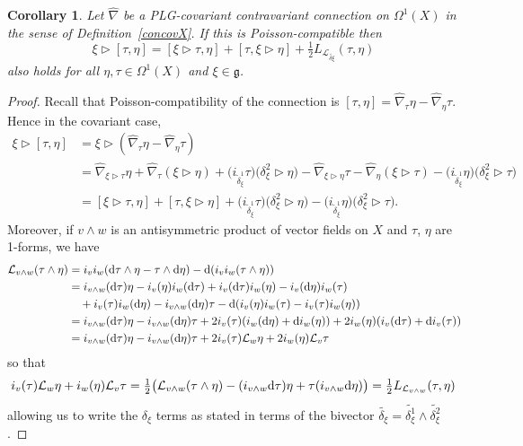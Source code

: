 \documentclass[10pt,a4paper]{amsart}
\numberwithin{equation}{section}
\newtheorem{Corollary}[Theorem]{Corollary}
\newcommand{\<}{{\langle}}
\renewcommand{\>}{{\rangle}}
\newcommand{\CL}{{\mathcal{L}}}
\newcommand{\extd}{{\rm d}}
\newcommand{\la}{{\triangleright}}
\newcommand{\cg}{{\mathfrak{g}}}
\begin{document}
\begin{Corollary}\label{corconcovX} Let $\hat\nabla$ be a PLG-covariant contravariant connection on $\Omega^1(X)$ in the sense of Definition~{\rm \ref{concovX}}. If this is Poisson-compatible then
\begin{equation*}%
\xi\la[\tau,\eta]=[\xi\la\tau,\eta]+[\tau,\xi\la\eta]+\tfrac{1}{2} L_{\CL_{\tilde{\delta\xi}}}(\tau,\eta)\end{equation*}
also holds for all $\eta,\tau\in \Omega^1(X)$ and $\xi\in \cg$.
\end{Corollary}
\begin{proof}
Recall that Poisson-compatibility of the connection is $[\tau,\eta]=\hat\nabla_\tau\eta-\hat\nabla_\eta\tau$. Hence in the covariant case,
\begin{align*}
\xi\la[\tau,\eta]& =\xi\la(\hat\nabla_\tau\eta-\hat\nabla_\eta\tau)\\
&=\hat\nabla_{\xi\la\tau}\eta+\hat\nabla_\tau(\xi\la\eta)+\big(i_{\tilde\delta_\xi^1}\tau\big) \big(\delta^2_\xi\la\eta\big)-\hat\nabla_{\xi\la\eta}\tau-\hat\nabla_\eta(\xi\la\tau)-\big(i_{\tilde\delta_\xi^1}\eta\big) \big(\delta^2_\xi\la\tau\big)\\
& =[\xi\la\tau,\eta]+[\tau,\xi\la\eta]+\big(i_{\tilde\delta_\xi^1}\tau\big) \big(\delta^2_\xi\la\eta\big)-\big(i_{\tilde\delta_\xi^1}\eta\big)\big(\delta^2_\xi\la\tau\big).
\end{align*}
Moreover, if $v\wedge w$ is an antisymmetric product of vector fields on $X$ and $\tau$, $\eta$ are 1-forms, we have
\begin{align*}
\CL_{v\wedge w}(\tau\wedge\eta)&=i_vi_w(\extd\tau\wedge \eta-\tau\wedge\extd\eta)-\extd(i_{v}i_w(\tau\wedge\eta))\\
&=i_{v\wedge w}(\extd \tau)\eta-i_v(\eta)i_w(\extd \tau)+i_v(\extd \tau)i_w(\eta)-i_v(\extd\eta)i_w(\tau)\\
&\quad{}+i_v(\tau)i_w(\extd\eta)-i_{v\wedge w}(\extd\eta)\tau -\extd(i_v(\eta)i_w(\tau)-i_v(\tau)i_w(\eta))\\
&=i_{v\wedge w}(\extd \tau)\eta -i_{v\wedge w}(\extd\eta)\tau + 2 i_v(\tau)(i_w(\extd \eta)+\extd i_w(\eta))+2 i_w(\eta)(i_v(\extd \tau)+\extd i_v(\tau))\!\\
&=i_{v\wedge w}(\extd \tau)\eta -i_{v\wedge w}(\extd\eta)\tau + 2 i_v(\tau)\CL_w\eta+2 i_w(\eta)\CL_v\tau \end{align*}
so that
\[ i_v(\tau)\CL_w\eta+ i_w(\eta)\CL_v\tau=\tfrac{1}{2} \big( \CL_{v\wedge w}(\tau\wedge\eta)-( i_{v\wedge w}\extd \tau)\eta+ \tau (i_{v\wedge w}\extd\eta)\big)=\tfrac{1}{2} L_{\CL_{v\wedge w}}(\tau,\eta)\]
allowing us to write the $\delta_\xi$ terms as stated in terms of the bivector $\tilde{\delta_\xi}=\tilde{\delta_\xi^1}\wedge\tilde{\delta_\xi^2}$.
\end{proof}
\end{document}
